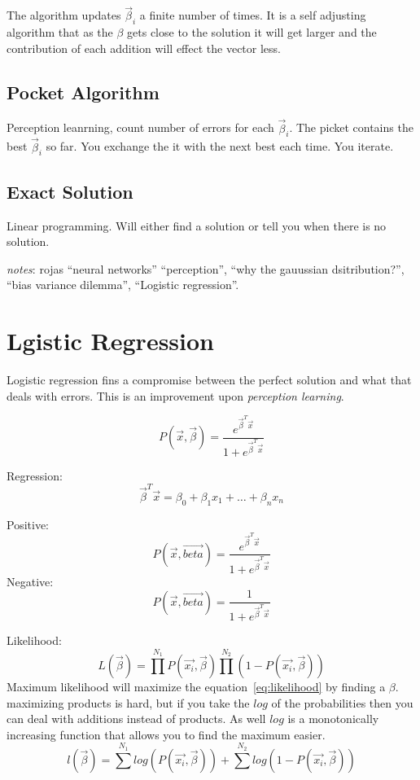 \documentclass[letter, 9pt]{article}
\begin{document}
The algorithm updates $\vec{\beta}_i$ a finite number of times. It is a self adjusting algorithm that as the $\beta$ gets close to the solution it will get larger and the contribution of each addition will effect the vector less.

\subsection{Pocket Algorithm}
Perception leanrning, count number of errors for each $\vec{\beta}_i$. The picket contains the best $\vec{\beta}_i$ so far. You exchange the it with the next best each time. You iterate.

\subsection{Exact Solution}
Linear programming. Will either find a solution or tell you when there is no solution.

\emph{notes}: rojas ``neural networks'' ``perception'', ``why the gauussian dsitribution?'', ``bias variance dilemma'', ``Logistic regression''.

\section{Lgistic Regression}
Logistic regression fins a compromise between the perfect solution and what that deals with  errors. This is an improvement upon \emph{perception learning}.

\begin{equation}
P(\vec{x}, \vec{\beta}) = \frac{e^{\vec{\beta}^T\vec{x}}}{1 + e^{\vec{\beta}^T\vec{x}}}
\end{equation}

Regression:
\begin{equation}
\vec{\beta}^T\vec{x} = \beta_0 + \beta_1 x_1 + \dots + \beta_n x_n
\end{equation}

Positive:
\begin{equation}
P(\vec{x}, \vec{beta}) = \frac{e^{\vec{\beta}^T\vec{x}}}{1 + e^{\vec{\beta}^T\vec{x}}}
\end{equation}
Negative:
\begin{equation}
P(\vec{x}, \vec{beta}) = \frac{1}{1 + e^{\vec{\beta}^T\vec{x}}}
\end{equation}

Likelihood:
\begin{equation}
\label{eq:likelihood}
L(\vec{\beta}) = \prod^{N_1} P(\vec{x_i}, \vec{\beta}) \prod^{N_2} (1 - P(\vec{x_i}, \vec{\beta}))
\end{equation}
Maximum likelihood will maximize the equation~\ref{eq:likelihood} by finding a $\beta$. maximizing products is hard, but if you take the $log$ of the probabilities then you can deal with additions instead of products. As well $log$ is a monotonically increasing function that allows you to find the maximum easier.
\begin{equation}
l(\vec{\beta}) = \sum^{N_1}log(P(\vec{x_i}, \vec{\beta})) + \sum^{N_2}log(1 - P(\vec{x_i}, \vec{\beta}))
\end{equation}
\end{document}
